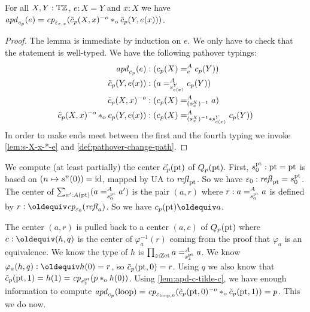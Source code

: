 \documentclass[a4,12pt]{amsart}
\begin{document}
\begin{lemma}\label{lem:apd-c-tilde-c}
For all $X,Y:{\mathrm{T}\mathbb{Z}}$, $e: X=Y$ and $x:X$ we have
$\mathop{{\it apd}_{c_p}}(e) = \mathit{cp}_{\varepsilon_{e,x}}
(\tilde c_p(X,x)^{-o}*_{\mathrm{o}} \tilde c_p(Y,e(x)))$.
\end{lemma}
\begin{proof}
The lemma is immediate by induction on $e$.
We only have to check that the statement is well-typed.
We have the following pathover typings:
\begin{align*}
\mathop{{\it apd}_{c_p}}(e) &: (c_p(X) =^A_e c_p(Y))\\
\tilde c_p(Y,e(x)) &:  (a =^A_{s^Y_{e(x)}} c_p(Y))\\
\tilde c_p(X,x)^{-o} &: (c_p(X) =^A_{(s^X_x)^{-1}} a)\\
\tilde c_p(X,x)^{-o} *_{\mathrm{o}} c_p(Y,e(x)) &: 
     (c_p(X) =^A_{(s^X_x)^{-1}* s^Y_{e(x)}} c_p(Y))\\
\end{align*}
In order to make ends meet between the first and the fourth typing
we invoke \cref{lem:s-X-x-*-e} and \cref{def:pathover-change-path}.
\end{proof}

We compute (at least partially) the center $\vec c_p({\mathord{\mathrm{pt}}})$ of $Q_p({\mathord{\mathrm{pt}}})$.
First, $s^{\mathord{\mathrm{pt}}}_0: {\mathord{\mathrm{pt}}} = {\mathord{\mathrm{pt}}}$ is based on $(n\mapsto s^n(0)) = \mathord{\mathrm{id}}$, 
mapped by UA to $\mathop{{\it refl}_{{\mathord{\mathrm{pt}}}}}$. So we have $\varepsilon_0 : \mathop{{\it refl}_{{\mathord{\mathrm{pt}}}}} = s^{\mathord{\mathrm{pt}}}_0$.
The center of $\sum_{a':A({\mathord{\mathrm{pt}}})} (a =^A_{s^{\mathord{\mathrm{pt}}}_0} a')$ is the pair
$(a,r)$ where $r: a =^A_{s^{\mathord{\mathrm{pt}}}_0} a$ is defined
by $r\defeq \cp{\varepsilon_0}(\refl{a})$.
So we have $c_p(\pt)\jdeq a$.

The center $(a,r)$ is pulled back to a center $(a,c)$ of $Q_p({\mathord{\mathrm{pt}}})$ 
where $c\defeq(h,q)$ is the center of $\varphi_{a}^{-1}(r)$ coming 
from the proof that $\varphi_{a}$ is an equivalence.
We know the type of $h$ is $\prod_{z:\mathrm{Zet}} a =^A_{s^{\mathord{\mathrm{pt}}}_z} a$.
We know $\varphi_{a}(h,q) \defeq h(0) = r$, so $\tilde c_p({\mathord{\mathrm{pt}}},0) = r$.
Using $q$ we also know that 
$\tilde c_p({\mathord{\mathrm{pt}}},1) = h(1) = \mathit{cp}_{\varepsilon^{\mathord{\mathrm{pt}}}_z}(p *_{\mathrm{o}} h(0))$.
Using \cref{lem:apd-c-tilde-c}, we have enough information to
compute $\mathop{{\it apd}_{c_p}}(\mathrm{loop}) = \mathit{cp}_{\varepsilon_{\mathrm{loop},0}}
(\tilde c_p({\mathord{\mathrm{pt}}},0)^{-o}*_{\mathrm{o}} \tilde c_p({\mathord{\mathrm{pt}}},1)) = p$. This we do now.
\end{document}
